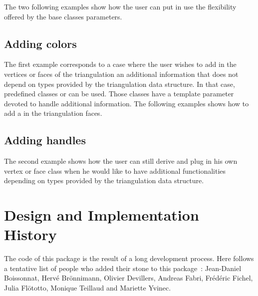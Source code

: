 The two following examples show how the user
can  put in use the flexibility offered by the
base classes parameters.

\subsection*{Adding colors} 

The first example corresponds to a case where the user wishes to add in 
the vertices or faces of the triangulation  an additional information
that does not depend on types provided
by the triangulation data structure. 
In that case, predefined classes
or 
can be used. Those classes have
a template parameter  devoted to
handle additional information.
The following examples shows how to add a 
 in the triangulation faces.



\subsection*{Adding handles}

The second example  shows how the user can  still
derive and plug in his own vertex 
or face class when he would like to have  
additional functionalities depending on types provided by the triangulation
data structure. 




\section{Design and Implementation History}

The code of this package is the result of a long development
process. Here follows a tentative list of people
who added their stone to this package~:
Jean-Daniel Boissonnat, Herv\'e Br\"onnimann, 
Olivier Devillers, Andreas Fabri, Fr\'ed\'eric Fichel,
Julia Fl\"ototto, Monique Teillaud and Mariette Yvinec.






